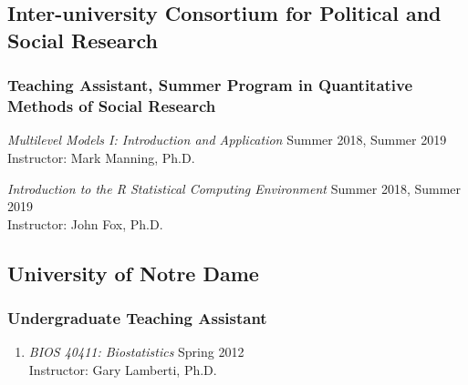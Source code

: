 \documentclass[letterpaper,11pt]{article} %
\begin{document}
	\subsection*{Inter-university Consortium for Political and Social Research}
		\subsubsection*{Teaching Assistant, Summer Program in Quantitative Methods of Social Research}
		\begin{etaremune}
			\item \textit{Multilevel Models I: Introduction and Application} \hfill Summer 2018, Summer 2019\\
			Instructor: Mark Manning, Ph.D.
			
			\item \textit{Introduction to the R Statistical Computing Environment} \hfill Summer 2018, Summer 2019 \\
			Instructor: John Fox, Ph.D.
		\end{etaremune}

    \subsection*{University of Notre Dame}
		\subsubsection*{Undergraduate Teaching Assistant}
		\begin{enumerate}
			\item \textit{BIOS 40411: Biostatistics} \hfill Spring 2012 \\
			Instructor: Gary Lamberti, Ph.D.
		\end{enumerate}
\end{document}
